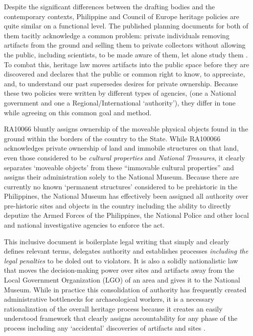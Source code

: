 \documentclass[english]{ijsra}
\begin{document}

Despite the significant differences between the drafting bodies and the contemporary contexts, Philippine and Council of Europe heritage policies are quite similar on a functional level. The published planning documents for both of them tacitly acknowledge a common problem: private individuals removing artifacts from the ground and selling them to private collectors without allowing the public, including scientists, to be made aware of them, let alone study them \parencites[2]{Valletta_1992}[18-20]{RA10066}. To combat this, heritage law moves artifacts into the public space before they are discovered and declares that the public or common right to know, to appreciate, and, to understand our past supersedes desires for private ownership. Because these two policies were written by different types of agencies, (one a National government and one a Regional/International ‘authority’), they differ in tone while agreeing on this common goal and method. 


RA10066 bluntly assigns ownership of the moveable physical objects found in the ground within the borders of the country to the State. While RA100066 acknowledges private ownership of land and immobile structures on that land, even those considered to be \textit{cultural properties} and \textit{National Treasures}, it clearly separates ‘moveable objects’ from these “immovable cultural properties” \parencite{RA10066} and assigns their administration solely to the National Museum. Because there are currently no known ‘permanent structures’ considered to be prehistoric in the Philippines, the National Museum has effectively been assigned all authority over pre-historic sites and objects in the country including the ability to directly deputize the Armed Forces of the Philippines, the National Police and other local and national investigative agencies to enforce the act. 

This inclusive document is boilerplate legal writing that simply and clearly defines relevant terms, delegates authority and establishes processes \textit{including the legal penalties} to be doled out to violators. 
It is also a solidly nationalistic law that moves the decision-making power over sites and artifacts away from the Local Government Organization (LGO) of an area and gives it to the National Museum. While in practice this consolidation of authority has frequently created administrative bottlenecks for archaeological workers, it is a necessary rationalization of the overall heritage process because it creates an easily understood framework that clearly assigns accountability for any phase of the process including any ‘accidental’ discoveries of artifacts and sites \parencite[8]{RA10066}.
\end{document}
